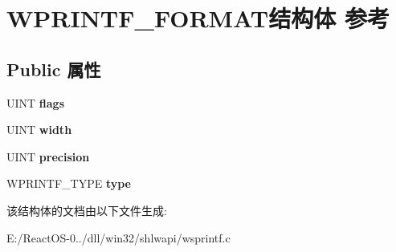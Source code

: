 \hypertarget{struct_w_p_r_i_n_t_f___f_o_r_m_a_t}{}\section{W\+P\+R\+I\+N\+T\+F\+\_\+\+F\+O\+R\+M\+A\+T结构体 参考}
\label{struct_w_p_r_i_n_t_f___f_o_r_m_a_t}
\subsection*{Public 属性}
\begin{DoxyCompactItemize}
\item 
\mbox{\label{struct_w_p_r_i_n_t_f___f_o_r_m_a_t_aa30df83312c1057c42ed6b75fb3d02e9}} 
U\+I\+NT {\bfseries flags}
\item 
\mbox{\label{struct_w_p_r_i_n_t_f___f_o_r_m_a_t_ab7e6799761db09d44241ca949d0f899c}} 
U\+I\+NT {\bfseries width}
\item 
\mbox{\label{struct_w_p_r_i_n_t_f___f_o_r_m_a_t_a5b05e1802c61944f99fef2b978365eac}} 
U\+I\+NT {\bfseries precision}
\item 
\mbox{\label{struct_w_p_r_i_n_t_f___f_o_r_m_a_t_a95b8885916f9b37b3963883152786693}} 
W\+P\+R\+I\+N\+T\+F\+\_\+\+T\+Y\+PE {\bfseries type}
\end{DoxyCompactItemize}


该结构体的文档由以下文件生成\+:\begin{DoxyCompactItemize}
\item 
E\+:/\+React\+O\+S-\/0../dll/win32/shlwapi/wsprintf.\+c\end{DoxyCompactItemize}
